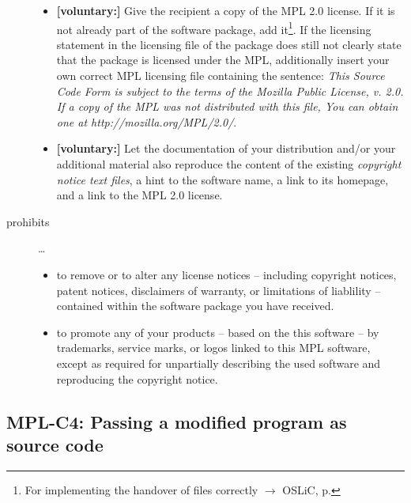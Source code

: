 \begin{description}
\begin{itemize}
  \item \textbf{[voluntary:]} Give the recipient a copy of the MPL 2.0 license.
  If it is not already part of the software package, add it\footnote{For
  implementing the handover of files correctly $\rightarrow$ OSLiC, p.
  \pageref{DistributingFilesHint}}. If the licensing statement in the licensing
  file of the package does still not clearly state that the package is licensed
  under the MPL, additionally insert your own correct MPL licensing file
  containing the sentence: \emph{This Source Code Form is subject to the terms
  of the Mozilla Public License, v. 2.0. If a copy of the MPL was not
  distributed with this file, You can obtain one at
  http://mozilla.org/MPL/2.0/}.
  
  \item \textbf{[voluntary:]} Let the documentation of your distribution and/or
  your additional material also reproduce the content of the existing
  \emph{copyright notice text files}, a hint to the software name, a link to its
  homepage, and a link to the MPL 2.0 license.
    
\end{itemize}

\item[prohibits] \ldots
\begin{itemize}
  \item to remove or to alter any license notices -- including copyright
  notices, patent notices, disclaimers of warranty, or limitations of liablility
  -- contained within the software package you have received.
  \item to promote any of your products -- based on the this software -- by
  trademarks, service marks, or logos linked to this MPL software, except as
  required for unpartially describing the used software and reproducing the
  copyright notice.
\end{itemize}

\end{description}

\subsection{MPL-C4: Passing a modified program as source code}
\label{OSUC-04S-MPL} 

